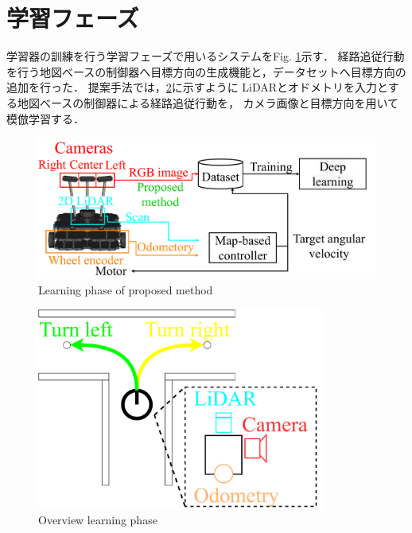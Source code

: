 \section{学習フェーズ}
\label{lerning}
学習器の訓練を行う学習フェーズで用いるシステムをFig. \ref{fig::learningsystem}示す．
経路追従行動を行う地図べースの制御器へ目標方向の生成機能と，データセットへ目標方向の追加を行った．
提案手法では，\ref{fig::learning_abs}に示すように
LiDARとオドメトリを入力とする地図べースの制御器による経路追従行動を，
カメラ画像と目標方向を用いて模倣学習する．
  \begin{figure}[h]
    \centering
    \includegraphics[width = 12cm]{./figs/system_learning.pdf}
    \caption{Learning phase of proposed method}
    \label{fig::learningsystem}
\end{figure}
\begin{figure}[h]
  \centering
  \includegraphics[width = 9.5cm]{./figs/ler_abs.pdf}
  \caption{Overview learning phase}
  \label{fig::learning_abs}
\end{figure}
\newpage
